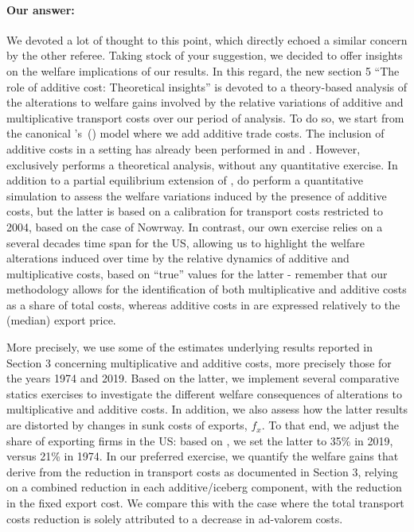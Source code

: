 \documentclass[a4paper,11pt]{article}
\newcommand\cites[1]{\citeauthor{#1}'s\ (\citeyear{#1})}
\begin{document}
\begin{itemize}
\begin{enumerate}
\begin{table}[htbp]
\paragraph{Our answer:}
\noindent We devoted a lot of thought to this point, which directly echoed a similar concern by the other referee. Taking stock of your suggestion, we decided to offer insights on the welfare implications of our results. In this regard, the new section 5 ``The role of additive cost: Theoretical insights'' is devoted to a theory-based analysis of the alterations to welfare gains involved by the relative variations of additive and multiplicative transport costs over our period of analysis. To do so, we start from the canonical \cites{melitz} model where we add additive trade costs. The inclusion of additive costs in a \citet{melitz} setting has already been performed in \citet{sorensen2014} and \citet{Irrazabal_2015}. However, \citet{sorensen2014} exclusively performs a theoretical analysis, without any quantitative exercise. In addition to a partial equilibrium extension of \citet{melitz}, \citet{Irrazabal_2015} do perform a quantitative simulation to assess the welfare variations induced by the presence of additive costs, but the latter is based on a calibration for transport costs restricted to 2004, based on the case of Nowrway. In contrast, our own exercise relies on a several decades time span for the US, allowing us to highlight the welfare alterations induced over time by the relative dynamics of additive and multiplicative costs, based on ``true'' values for the latter - remember that our methodology allows for the identification of both multiplicative and additive costs as a share of total costs, whereas additive costs in \citet{Irrazabal_2015} are expressed relatively to the (median) export price.

More precisely, we use some of the estimates underlying results reported in Section 3 concerning multiplicative and additive costs, more precisely those for the years 1974 and 2019. Based on the latter, we implement several comparative statics exercises to investigate the different welfare consequences of alterations to multiplicative and additive costs. In addition, we also assess how the latter results are distorted by changes in sunk costs of exports, $f_{x}$. To that end, we adjust the share of exporting firms in the US: based on \citet{Lincoln_McCallum2018}, we set the latter to 35\% in 2019, versus 21\% in 1974. In our preferred exercise, we quantify the welfare gains that derive from the reduction in transport costs as documented in Section 3, relying on a combined reduction in each additive/iceberg component, with the reduction in the fixed export cost. We compare this with the case where the total transport costs reduction is solely attributed to a decrease in ad-valorem costs.


\end{table}
\end{enumerate}
\end{itemize}
\end{document}
